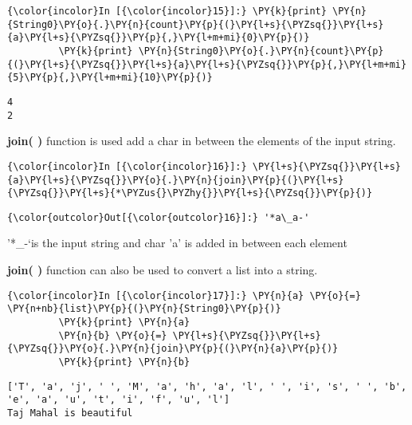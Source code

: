     \begin{Verbatim}[commandchars=\\\{\}]
{\color{incolor}In [{\color{incolor}15}]:} \PY{k}{print} \PY{n}{String0}\PY{o}{.}\PY{n}{count}\PY{p}{(}\PY{l+s}{\PYZsq{}}\PY{l+s}{a}\PY{l+s}{\PYZsq{}}\PY{p}{,}\PY{l+m+mi}{0}\PY{p}{)}
         \PY{k}{print} \PY{n}{String0}\PY{o}{.}\PY{n}{count}\PY{p}{(}\PY{l+s}{\PYZsq{}}\PY{l+s}{a}\PY{l+s}{\PYZsq{}}\PY{p}{,}\PY{l+m+mi}{5}\PY{p}{,}\PY{l+m+mi}{10}\PY{p}{)}
\end{Verbatim}

    \begin{Verbatim}[commandchars=\\\{\}]
4
2
    \end{Verbatim}

    \textbf{join( )} function is used add a char in between the elements of
the input string.

    \begin{Verbatim}[commandchars=\\\{\}]
{\color{incolor}In [{\color{incolor}16}]:} \PY{l+s}{\PYZsq{}}\PY{l+s}{a}\PY{l+s}{\PYZsq{}}\PY{o}{.}\PY{n}{join}\PY{p}{(}\PY{l+s}{\PYZsq{}}\PY{l+s}{*\PYZus{}\PYZhy{}}\PY{l+s}{\PYZsq{}}\PY{p}{)}
\end{Verbatim}

            \begin{Verbatim}[commandchars=\\\{\}]
{\color{outcolor}Out[{\color{outcolor}16}]:} '*a\_a-'
\end{Verbatim}
        
    '*\_-`is the input string and char 'a' is added in between each element

    \textbf{join( )} function can also be used to convert a list into a
string.

    \begin{Verbatim}[commandchars=\\\{\}]
{\color{incolor}In [{\color{incolor}17}]:} \PY{n}{a} \PY{o}{=} \PY{n+nb}{list}\PY{p}{(}\PY{n}{String0}\PY{p}{)}
         \PY{k}{print} \PY{n}{a}
         \PY{n}{b} \PY{o}{=} \PY{l+s}{\PYZsq{}}\PY{l+s}{\PYZsq{}}\PY{o}{.}\PY{n}{join}\PY{p}{(}\PY{n}{a}\PY{p}{)}
         \PY{k}{print} \PY{n}{b}
\end{Verbatim}

    \begin{Verbatim}[commandchars=\\\{\}]
['T', 'a', 'j', ' ', 'M', 'a', 'h', 'a', 'l', ' ', 'i', 's', ' ', 'b', 'e', 'a', 'u', 't', 'i', 'f', 'u', 'l']
Taj Mahal is beautiful
    \end{Verbatim}

